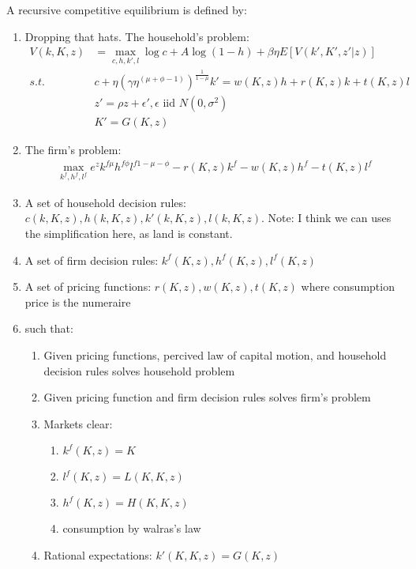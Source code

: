 \documentclass[answers]{exam}
\begin{document}
\begin{questions}
\begin{solution}
    A recursive competitive equilibrium is defined by:
    \begin{enumerate}
        \item Dropping that hats. The household's problem:
        \begin{align*}
            V(k,K,z) &= \max_{c,h,k',l} \log c + A \log(1-h) + \beta \eta E[V(k',K',z'|z)]\\
            s.t.\ &c + \eta  (\gamma \eta^{(\mu+\phi-1)})^\frac{1}{1-\mu} k' = w(K,z)h + r(K,z)k + t(K,z)l\\
            &z' = \rho z + \epsilon', \epsilon \text{ iid } N(0,\sigma^2)\\
            &K' = G(K,z)
        \end{align*}
        \item The firm's problem:
        \begin{align*}
            \max_{k^f,h^f,l^f} e^{z} k^{f\mu} h^{f\phi}l^{f1- \mu -\phi} - r(K,z)k^f - w(K,z)h^f - t(K,z)l^f
        \end{align*}
        \item A set of household decision rules: $c(k,K,z), h(k,K,z), k'(k,K,z), l(k,K,z)$. Note: I think we can uses the simplification here, as land is constant.
        \item A set of firm decision rules: $k^f(K,z), h^f(K,z), l^f(K,z)$
        \item A set of pricing functions: $r(K,z),  w(K,z), t(K,z)$ where consumption price is the numeraire
        \item such that:
        \begin{enumerate}
            \item Given pricing functions, percived law of capital motion, and household decision rules solves household problem
            \item Given pricing function and firm decision rules solves firm's problem
            \item Markets clear:
            \begin{enumerate}
                \item $k^f(K,z) = K$
                \item $l^f(K,z) = L(K,K,z)$
                \item $h^f(K,z) = H(K,K,z)$
                \item consumption by walras's law
            \end{enumerate}
            \item Rational expectations: $k'(K,K,z) = G(K,z)$

\end{enumerate}
\end{enumerate}
\end{solution}
\end{questions}
\end{document}
